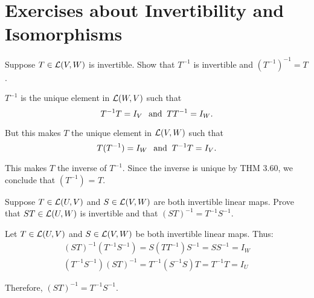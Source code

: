 \section*{Exercises about Invertibility and Isomorphisms}

\begin{xrcs}
  Suppose $T \in \mathcal{L}(V,W)$ is invertible. Show that $T^{-1}$ is invertible and $(T^{-1})^{-1} = T$.

  \begin{xprf}
    $T^{-1}$ is the unique element in $\mathcal{L}(W,V)$ such that
    \begin{equation}
      T^{-1} T = I_V \;\;\, \text{and}\;\; TT^{-1} = I_W.
    \end{equation}

    But this makes $T$ the unique element in $\mathcal{L}(V,W)$ such that
    \begin{equation}
      T(T^{-1}) = I_W \;\;\, \text{and}\;\; T^{-1} T = I_V.
    \end{equation}

    This makes $T$ the inverse of $T^{-1}$. Since the inverse is unique by THM 3.60, we conclude that $(T^{-1})$ = $T$.
  \end{xprf}
\end{xrcs}

\begin{xrcs}
  Suppose $T \in \mathcal{L}(U,V)$ and $S \in \mathcal{L}(V,W)$ are both invertible linear maps. Prove that $ST \in \mathcal{L}(U,W)$ is invertible and that $(ST)^{-1} = T^{-1} S^{-1}$.

  \begin{xprf}
    Let $T \in \mathcal{L}(U,V)$ and $S \in \mathcal{L}(V,W)$ be both invertible linear maps. Thus:
    \begin{equation}
      \begin{aligned}
        (ST)^{-1} (T^{-1} S^{-1}) = S (T T^{-1}) S^{-1}
                                  = S S^{-1}
                                  = I_W \\
        (T^{-1} S^{-1}) (ST)^{-1} = T^{-1} (S^{-1} S) T
                                  = T^{-1} T
                                  = I_U
      \end{aligned}
    \end{equation}

    Therefore, $(ST)^{-1} = T^{-1} S^{-1}$.
  \end{xprf}
\end{xrcs}

